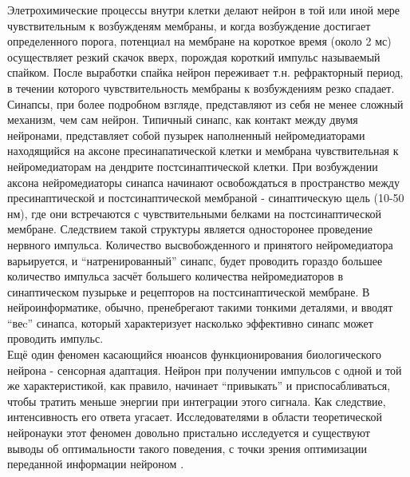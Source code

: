 \documentclass[a4paper,10pt]{article}
\begin{document}
\indent Элетрохимические процессы внутри клетки делают нейрон в той или иной мере чувствительным к возбужденям мембраны, и когда возбуждение достигает определенного порога, потенциал на мембране на короткое время (около 2 мс) осуществляет резкий скачок вверх, порождая короткий импульс называемый спайком. После выработки спайка нейрон переживает т.н. рефракторный период, в течении которого чувствительность мембраны к возбуждениям резко спадает.\\
\indent Синапсы, при более подробном взгляде, представляют из себя не менее сложный механизм, чем сам нейрон. Типичный синапс, как контакт между двумя нейронами, представляет собой пузырек наполненный нейромедиаторами находящийся на аксоне пресинапатической клетки и мембрана чувствительная к нейромедиаторам на дендрите постсинаптической клетки. При возбуждении аксона нейромедиаторы синапса начинают освобождаться в пространство между пресинаптической и постсинаптической мембраной - синаптическую щель (10-50 нм), где они встречаются с чувствительными белками на постсинаптической мембране. Следствием такой структуры является односторонее проведение нервного импульса. Количество высвобожденного и принятого нейромедиатора варьируется, и ``натренированный'' синапс, будет проводить гораздо большее количество импульса засчёт большего количества нейромедиаторов в синаптическом пузырьке и рецепторов на постсинаптической мембране. В нейроинформатике, обычно, пренебрегают такими тонкими деталями, и вводят ``веc'' синапса, который характеризует насколько эффективно синапс может проводить импульс.\\
\indent Ещё один феномен касающийся нюансов функционирования биологического нейрона - сенсорная адаптация\cite{Phizi}. Нейрон при получении импульсов с одной и той же характеристикой, как правило, начинает ``привыкать'' и приспосабливаться, чтобы тратить меньше энергии при интеграции этого сигнала. Как следствие, интенсивность его ответа угасает. Исследователями в области теоретической нейронауки этот феномен довольно пристально исследуется и существуют выводы об оптимальности такого поведения, с точки зрения оптимизации переданной информации нейроном \cite{Adapt,TripleAdapt}.
\end{document}
